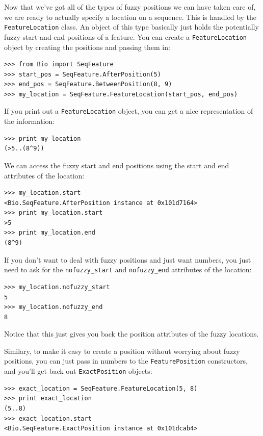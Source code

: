 \documentclass{report}
\begin{document}
Now that we've got all of the types of fuzzy positions we can have taken care of, we are ready to actually specify a location on a sequence. This is handled by the \verb|FeatureLocation| class. An object of this type basically just holds the potentially fuzzy start and end positions of a feature. You can create a \verb|FeatureLocation| object by creating the positions and passing them in:

\begin{verbatim}
>>> from Bio import SeqFeature
>>> start_pos = SeqFeature.AfterPosition(5)
>>> end_pos = SeqFeature.BetweenPosition(8, 9)
>>> my_location = SeqFeature.FeatureLocation(start_pos, end_pos)
\end{verbatim}

If you print out a \verb|FeatureLocation| object, you can get a nice representation of the information:

\begin{verbatim}
>>> print my_location
(>5..(8^9))
\end{verbatim}

We can access the fuzzy start and end positions using the start and end attributes of the location:

\begin{verbatim}
>>> my_location.start
<Bio.SeqFeature.AfterPosition instance at 0x101d7164>
>>> print my_location.start
>5
>>> print my_location.end
(8^9)
\end{verbatim}

If you don't want to deal with fuzzy positions and just want numbers, you just need to ask for the \verb|nofuzzy_start| and \verb|nofuzzy_end| attributes of the location:

\begin{verbatim}
>>> my_location.nofuzzy_start 
5
>>> my_location.nofuzzy_end
8
\end{verbatim}

Notice that this just gives you back the position attributes of the fuzzy locations.


Similary, to make it easy to create a position without worrying about fuzzy positions, you can just pass in numbers to the \verb|FeaturePosition| constructors, and you'll get back out \verb|ExactPosition| objects:

\begin{verbatim}
>>> exact_location = SeqFeature.FeatureLocation(5, 8)
>>> print exact_location
(5..8)
>>> exact_location.start
<Bio.SeqFeature.ExactPosition instance at 0x101dcab4>
\end{verbatim}
\end{document}
